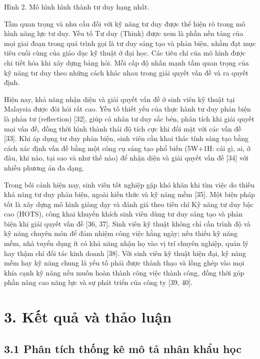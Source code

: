 Hình 2. Mô hình hình thành tư duy hạng nhất.

Tầm quan trọng và nhu cầu đối với kỹ năng tư duy được thể hiện rõ trong mô hình năng lực tư duy. Yếu tố Tư duy (Think) được xem là phần nền tảng của mọi giai đoạn trong quá trình gọi là tư duy sáng tạo và phản biện, nhằm đạt mục tiêu cuối cùng của giáo dục kỹ thuật ở đại học. Các tiêu chí của mô hình được chi tiết hóa khi xây dựng bảng hỏi. Mỗi cấp độ nhấn mạnh tầm quan trọng của kỹ năng tư duy theo những cách khác nhau trong giải quyết vấn đề và ra quyết định.

Hiện nay, khả năng nhận diện và giải quyết vấn đề ở sinh viên kỹ thuật tại Malaysia được đòi hỏi rất cao. Yếu tố thiết yếu của thực hành tư duy phản biện là phản tư (reflection) {[}32{]}, giúp cá nhân tư duy sắc bén, phân tích khi giải quyết mọi vấn đề, đồng thời hình thành thái độ tích cực khi đối mặt với các vấn đề {[}33{]}. Khi áp dụng tư duy phản biện, sinh viên cần khai thác tính sáng tạo bằng cách xác định vấn đề bằng một công cụ sáng tạo phổ biến (5W+1H: cái gì, ai, ở đâu, khi nào, tại sao và như thế nào) để nhận diện và giải quyết vấn đề {[}34{]} với nhiều phương án đa dạng.

Trong bối cảnh hiện nay, sinh viên tốt nghiệp gặp khó khăn khi tìm việc do thiếu khả năng tư duy phản biện, ngoài kiến thức và kỹ năng mềm {[}35{]}. Một biện pháp tốt là xây dựng mô hình giảng dạy và đánh giá theo tiêu chí Kỹ năng tư duy bậc cao (HOTS), công khai khuyến khích sinh viên dùng tư duy sáng tạo và phản biện khi giải quyết vấn đề {[}36, 37{]}. Sinh viên kỹ thuật không chỉ cần trình độ và kỹ năng chuyên môn để đảm nhiệm công việc hằng ngày; nếu thiếu kỹ năng mềm, nhà tuyển dụng ít có khả năng nhận họ vào vị trí chuyên nghiệp, quản lý hay thậm chí đối tác kinh doanh {[}38{]}. Với sinh viên kỹ thuật hiện đại, kỹ năng mềm hay kỹ năng chung là yếu tố phải được thành thạo và lồng ghép vào mọi khía cạnh kỹ năng nếu muốn hoàn thành công việc thành công, đồng thời góp phần nâng cao năng lực và sự phát triển của công ty {[}39, 40{]}.

\section{3. Kết quả và thảo luận}

\subsection{3.1 Phân tích thống kê mô tả nhân khẩu học}

